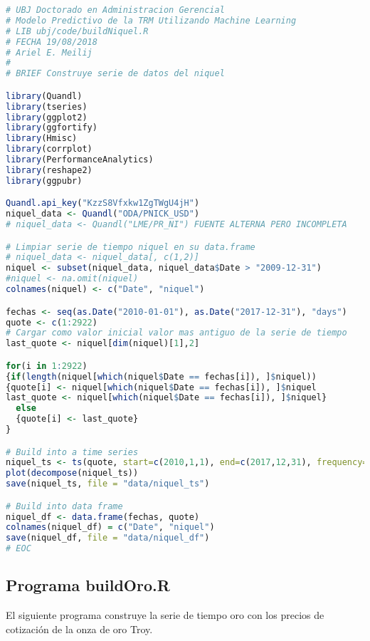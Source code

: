 \begin{lstlisting}[language=R]
# UBJ Doctorado en Administracion Gerencial
# Modelo Predictivo de la TRM Utilizando Machine Learning
# LIB ubj/code/buildNiquel.R
# FECHA 19/08/2018
# Ariel E. Meilij
#
# BRIEF Construye serie de datos del niquel

library(Quandl)
library(tseries)
library(ggplot2)
library(ggfortify)
library(Hmisc)
library(corrplot)
library(PerformanceAnalytics)
library(reshape2)
library(ggpubr)

Quandl.api_key("KzzS8Vfxkw1ZgTWgU4jH")
niquel_data <- Quandl("ODA/PNICK_USD")
# niquel_data <- Quandl("LME/PR_NI") FUENTE ALTERNA PERO INCOMPLETA

# Limpiar serie de tiempo niquel en su data.frame
# niquel_data <- niquel_data[, c(1,2)]
niquel <- subset(niquel_data, niquel_data$Date > "2009-12-31")
#niquel <- na.omit(niquel)
colnames(niquel) <- c("Date", "niquel")

fechas <- seq(as.Date("2010-01-01"), as.Date("2017-12-31"), "days")
quote <- c(1:2922)
# Cargar como valor inicial valor mas antiguo de la serie de tiempo
last_quote <- niquel[dim(niquel)[1],2]

for(i in 1:2922)
{if(length(niquel[which(niquel$Date == fechas[i]), ]$niquel))
{quote[i] <- niquel[which(niquel$Date == fechas[i]), ]$niquel
last_quote <- niquel[which(niquel$Date == fechas[i]), ]$niquel}
  else
  {quote[i] <- last_quote}
}

# Build into a time series
niquel_ts <- ts(quote, start=c(2010,1,1), end=c(2017,12,31), frequency=365)
plot(decompose(niquel_ts))
save(niquel_ts, file = "data/niquel_ts")

# Build into data frame
niquel_df <- data.frame(fechas, quote)
colnames(niquel_df) = c("Date", "niquel")
save(niquel_df, file = "data/niquel_df")
# EOC
\end{lstlisting}

\subsection{Programa buildOro.R}
El siguiente programa construye la serie de tiempo oro con los precios de cotización de la onza de oro Troy.

